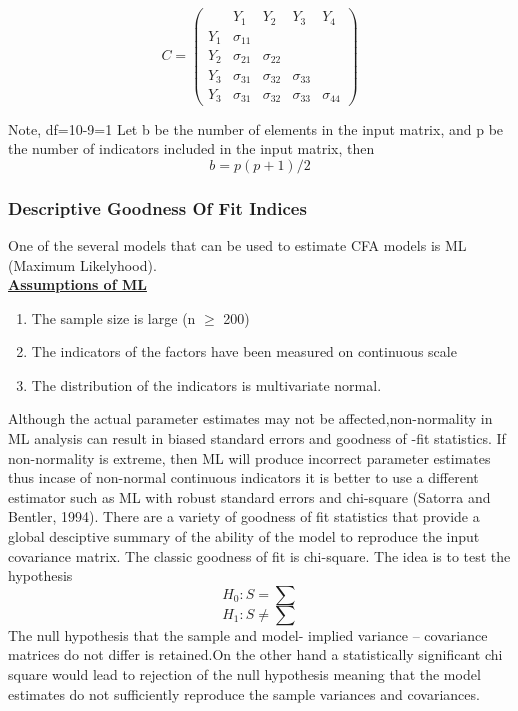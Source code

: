 \documentclass[12pt]{article}
\begin{document}
$$C=\begin{pmatrix}
	& Y_1 & Y_2  & Y_3 & Y_4\\ 
	Y_1& \sigma_{11} &  & \\ 
	Y_2& \sigma_{21} & \sigma_{22} & \\ 
	Y_3&  \sigma_{31}&\sigma_{32}  & \sigma_{33} &\\
	Y_3&  \sigma_{31}&\sigma_{32}  & \sigma_{33} & \sigma_{44}
\end{pmatrix}$$

\noindent Note, df=10-9=1 Let b be the number of elements in the input matrix, and p be the
number of indicators included in the input matrix, then\\
$$b = p(p + 1)/2$$
\subsubsection{Descriptive Goodness Of Fit Indices}
One of the several models that can be used to estimate CFA models is ML (Maximum Likelyhood).\\
\noindent \textbf{\underline{Assumptions of ML}}

\begin{enumerate}
	\item The sample size is large (n $\geq$ 200)
	\item The indicators of the factors have been measured on continuous scale
	\item The distribution of the indicators is multivariate normal.
\end{enumerate}
Although the actual parameter estimates may not be affected,non-normality in ML analysis can result in biased standard errors and goodness of -fit statistics.
If non-normality is extreme, then ML will produce incorrect parameter estimates thus incase of non-normal continuous indicators it is better to use a different estimator such as ML with robust standard errors and chi-square (Satorra and Bentler, 1994).
There are a variety of goodness of fit statistics that provide a global desciptive summary of the ability of the model to reproduce the input covariance matrix. The classic goodness of fit is chi-square.
The idea is to test the hypothesis
$$H_0: S= \sum$$
$$H_1: S \neq \sum$$
The null hypothesis that the sample and model- implied variance – covariance matrices do not differ is retained.On the other hand a statistically significant chi square would lead to rejection of the null hypothesis meaning that the model estimates do not sufficiently reproduce the sample variances and covariances.
\end{document}

